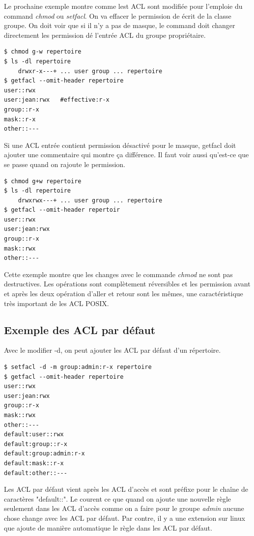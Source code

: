Le prochaine exemple montre comme lest ACL sont modifiée pour l'emploie du command \emph{chmod} ou \emph{setfacl}. On va effacer le permission de écrit de la classe groupe. On doit voir que si il n'y a pas de masque, le command doit changer directement les permission dé l'entrée ACL du groupe propriétaire. 


\begin{verbatim}
$ chmod g-w repertoire 
$ ls -dl repertoire 
	drwxr-x---+ ... user group ... repertoire 
$ getfacl --omit-header repertoire 
user::rwx 
user:jean:rwx 	#effective:r-x
group::r-x 	
mask::r-x 
other::---

\end{verbatim}

Si une ACL entrée contient permission désactivé pour le masque, getfacl doit ajouter une commentaire qui montre ça différence. Il faut voir aussi qu'est-ce que se passe quand on rajoute le permission. 

\begin{verbatim}
$ chmod g+w repertoire 
$ ls -dl repertoire 
	drwxrwx---+ ... user group ... repertoire 
$ getfacl --omit-header repertoir 
user::rwx 
user:jean:rwx 
group::r-x
mask::rwx
other::---
\end{verbatim}

Cette exemple montre que les changes avec le commande \emph{chmod} ne sont pas destructives. Les opérations sont complètement réversibles et les permission avant et après les deux opération d'aller et retour sont les mêmes, une caractéristique très important de les ACL POSIX. 

\subsection*{Exemple des ACL par défaut}

Avec le modifier -d, on peut ajouter les ACL par défaut d'un répertoire. 

\begin{verbatim}
$ setfacl -d -m group:admin:r-x repertoire 
$ getfacl --omit-header repertoire 
user::rwx
user:jean:rwx
group::r-x 
mask::rwx
other::---
default:user::rwx
default:group::r-x
default:group:admin:r-x
default:mask::r-x
default:other::---
\end{verbatim} 

Les ACL par défaut vient après les ACL d'accès et sont préfixe pour le chaîne de caractères "default::". Le courent ce que quand on ajoute une nouvelle règle seulement dans les ACL d'accès comme on a faire pour le groupe \emph{admin} aucune chose change avec les ACL par défaut. Par contre, il y a une extension sur linux que ajoute de manière automatique le règle dans les ACL par défaut. 


